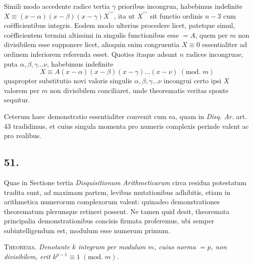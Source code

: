 \documentclass[twoside,12pt, showframe]{memoir}
\renewcommand{\pmod}[1]{\;(\textrm{mod.}\;#1)}
\begin{document}
Simili modo accedente radice tertia \(\gamma\) prioribus incongrua, habebimus indefinite \(X \equiv(x-\alpha)(x-\beta)(x-\gamma) X^{\prime \prime \prime}\), ita ut \(X^{\prime \prime \prime}\) sit functio ordinis \(n-3\) cum coëfficientibus integris. Eodem modo ulterius procedere licet, patetque simul, coëfficientem termini altissimi in singulis functionibus esse \(=A\), quem per \(m\) non divisibilem esse supponere licet, alioquin enim congruentia \(X \equiv 0\) essentialiter ad ordinem inferiorem referenda esset. Quoties itaque adsunt \(n\) radices incongruae, puta \(\alpha, \beta, \gamma \ldots \nu\), habebimus indefinite
\[X \equiv A(x-\alpha)(x-\beta)(x-\gamma) \ldots(x-\nu)\pmod{m}\]
quapropter substitutio novi valoris singulis \(\alpha, \beta, \gamma \ldots \nu\) incongrui certo ipsi \(X\) valorem per \(m\) non divisibilem conciliaret, unde theorematis veritas sponte sequitur.
 
Ceterum haec demonstratio essentialiter convenit cum ea, quam in \textit{Disq. Ar.} art. 43 tradidimus, et cuius singula momenta pro numeris complexis perinde valent ac pro realibus.\clearpage\noindent%

\subsection*{51.}
 
Quae in Sectione tertia \textit{Disquisitionum Arithmeticarum} circa residua potestatum tradita sunt, ad maximam partem, levibus mutationibus adhibitis, etiam in arithmetica numerorum complexorum valent: quinadeo demonstrationes theorematum plerumque retineri possent. Ne tamen quid desit, theoremata principalia demonstrationibus concisis firmata proferemus, ubi semper subintelligendum est, modulum esse numerum primum.

\textsc{Theorema.} \textit{Denotante \(k\) integrum per modulum \(m\), cuius norma \(=p\), non divisibilem, erit \(k^{p-1} \equiv 1 \pmod{m}\).}
 
\end{document}
